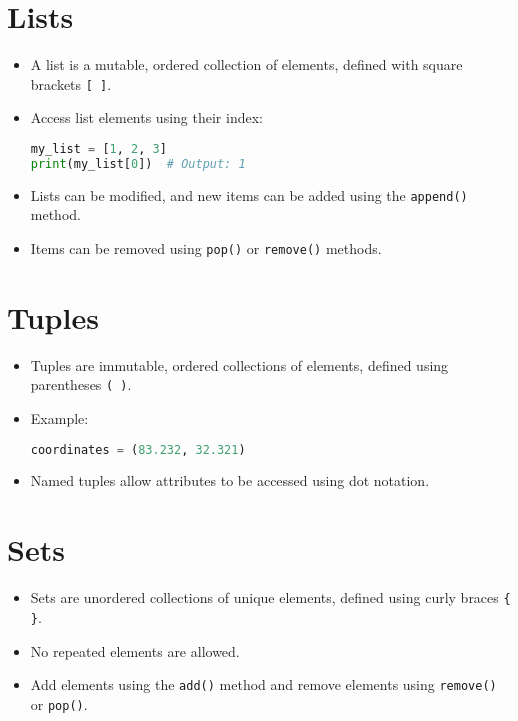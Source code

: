 \documentclass{article}
\begin{document}
\section{Lists}
\begin{itemize}
    \item A list is a mutable, ordered collection of elements, defined with square brackets \texttt{[ ]}.
    \item Access list elements using their index:
\begin{lstlisting}[language=python]
my_list = [1, 2, 3]
print(my_list[0])  # Output: 1
\end{lstlisting}
    \item Lists can be modified, and new items can be added using the \texttt{append()} method.
    \item Items can be removed using \texttt{pop()} or \texttt{remove()} methods.
\end{itemize}

\section{Tuples}
\begin{itemize}
    \item Tuples are immutable, ordered collections of elements, defined using parentheses \texttt{( )}.
    \item Example:
    \begin{lstlisting}[language=python]
coordinates = (83.232, 32.321)
    \end{lstlisting}
    \item Named tuples allow attributes to be accessed using dot notation.
\end{itemize}

\section{Sets}
\begin{itemize}
    \item Sets are unordered collections of unique elements, defined using curly braces \texttt{\{ \}}.
    \item No repeated elements are allowed.
    \item Add elements using the \texttt{add()} method and remove elements using \texttt{remove()} or \texttt{pop()}.
\end{itemize}
\end{document}
